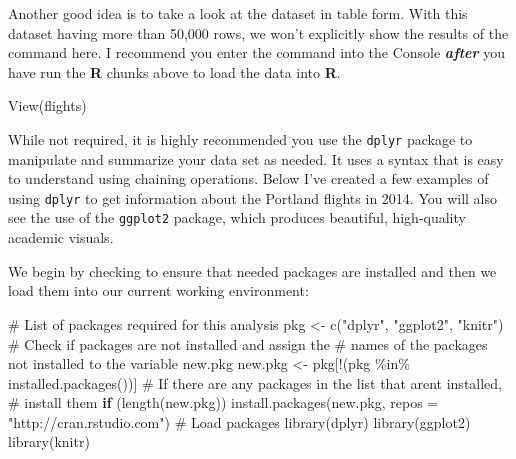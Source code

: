 \documentclass[
  letterpaper,
  12pt,
  twoside]{reedthesis}
\newenvironment{Shaded}{\begin{snugshade}}{\end{snugshade}}
\newcommand{\AttributeTok}[1]{\textcolor[rgb]{0.40,0.45,0.13}{#1}}
\newcommand{\CommentTok}[1]{\textcolor[rgb]{0.37,0.37,0.37}{#1}}
\newcommand{\ControlFlowTok}[1]{\textcolor[rgb]{0.00,0.23,0.31}{\textbf{#1}}}
\newcommand{\FunctionTok}[1]{\textcolor[rgb]{0.28,0.35,0.67}{#1}}
\newcommand{\NormalTok}[1]{\textcolor[rgb]{0.00,0.23,0.31}{#1}}
\newcommand{\OtherTok}[1]{\textcolor[rgb]{0.00,0.23,0.31}{#1}}
\newcommand{\SpecialCharTok}[1]{\textcolor[rgb]{0.37,0.37,0.37}{#1}}
\newcommand{\StringTok}[1]{\textcolor[rgb]{0.13,0.47,0.30}{#1}}
\begin{document}
Another good idea is to take a look at the dataset in table form. With
this dataset having more than 50,000 rows, we won't explicitly show the
results of the command here. I recommend you enter the command into the
Console \textbf{\emph{after}} you have run the \textbf{R} chunks above
to load the data into \textbf{R}.

\begin{Shaded}
\begin{Highlighting}[]
\FunctionTok{View}\NormalTok{(flights)}
\end{Highlighting}
\end{Shaded}

While not required, it is highly recommended you use the \texttt{dplyr}
package to manipulate and summarize your data set as needed. It uses a
syntax that is easy to understand using chaining operations. Below I've
created a few examples of using \texttt{dplyr} to get information about
the Portland flights in 2014. You will also see the use of the
\texttt{ggplot2} package, which produces beautiful, high-quality
academic visuals.

We begin by checking to ensure that needed packages are installed and
then we load them into our current working environment:

\begin{Shaded}
\begin{Highlighting}[]
\CommentTok{\# List of packages required for this analysis}
\NormalTok{pkg }\OtherTok{\textless{}{-}} \FunctionTok{c}\NormalTok{(}\StringTok{"dplyr"}\NormalTok{, }\StringTok{"ggplot2"}\NormalTok{, }\StringTok{"knitr"}\NormalTok{)}
\CommentTok{\# Check if packages are not installed and assign the}
\CommentTok{\# names of the packages not installed to the variable new.pkg}
\NormalTok{new.pkg }\OtherTok{\textless{}{-}}\NormalTok{ pkg[}\SpecialCharTok{!}\NormalTok{(pkg }\SpecialCharTok{\%in\%} \FunctionTok{installed.packages}\NormalTok{())]}
\CommentTok{\# If there are any packages in the list that aren\textquotesingle{}t installed,}
\CommentTok{\# install them}
\ControlFlowTok{if}\NormalTok{ (}\FunctionTok{length}\NormalTok{(new.pkg))}
  \FunctionTok{install.packages}\NormalTok{(new.pkg, }\AttributeTok{repos =} \StringTok{"http://cran.rstudio.com"}\NormalTok{)}
\CommentTok{\# Load packages}
\FunctionTok{library}\NormalTok{(dplyr)}
\FunctionTok{library}\NormalTok{(ggplot2)}
\FunctionTok{library}\NormalTok{(knitr)}
\end{Highlighting}
\end{Shaded}
\end{document}
